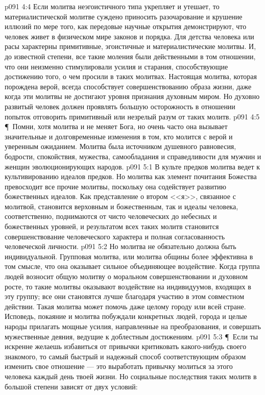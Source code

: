 \vs p091 4:4 Если молитва неэгоистичного типа укрепляет и утешает, то материалистической молитве суждено приносить разочарование и крушение иллюзий по мере того, как передовые научные открытия демонстрируют, что человек живет в физическом мире законов и порядка. Для детства человека или расы характерны примитивные, эгоистичные и материалистические молитвы. И, до известной степени, все такие моления были действенными в том отношении, что они неизменно стимулировали усилия и старания, способствующие достижению того, о чем просили в таких молитвах. Настоящая молитва, которая порождена верой, всегда способствует совершенствованию образа жизни, даже когда эти молитвы не достигают уровня признания духовным миром. Но духовно развитый человек должен проявлять большую осторожность в отношении попыток отговорить примитивный или незрелый разум от таких молитв.
\vs p091 4:5 \P\ Помни, хотя молитва и не меняет Бога, но очень часто она вызывает значительные и долговременные изменения в том, кто молится с верой и уверенным ожиданием. Молитва была источником душевного равновесия, бодрости, спокойствия, мужества, самообладания и справедливости для мужчин и женщин эволюционирующих народов.
\vs p091 5:1 В культе предков молитва ведет к культивированию идеалов предков. Но молитва как элемент почитания Божества превосходит все прочие молитвы, поскольку она содействует развитию божественных идеалов. Как представление о втором <<я>>, связанное с молитвой, становится верховным и божественным, так и идеалы человека, соответственно, поднимаются от чисто человеческих до небесных и божественных уровней, и результатом всех таких молитв становится совершенствование человеческого характера и полная согласованность человеческой личности.
\vs p091 5:2 Но молитва не обязательно должна быть индивидуальной. Групповая молитва, или молитва общины более эффективна в том смысле, что она оказывает сильное объединяющее воздействие. Когда группа людей возносит общую молитву о моральном совершенствовании и духовном росте, то такие молитвы оказывают воздействие на индивидуумов, входящих в эту группу; все они становятся лучше благодаря участию в этом совместном действии. Такая молитва может помочь даже целому городу или всей стране. Исповедь, покаяние и молитва побуждали конкретных людей, города и целые народы прилагать мощные усилия, направленные на преобразования, и совершать мужественные деяния, ведущие к доблестным достижениям.
\vs p091 5:3 \P\ Если ты искренне желаешь избавиться от привычки критиковать какого\hyp{}нибудь своего знакомого, то самый быстрый и надежный способ соответствующим образом изменить свое отношение --- это выработать привычку молиться за этого человека каждый день твоей жизни. Но социальные последствия таких молитв в большой степени зависят от двух условий:

